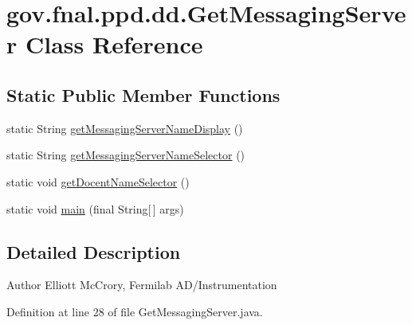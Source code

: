 \hypertarget{classgov_1_1fnal_1_1ppd_1_1dd_1_1GetMessagingServer}{\section{gov.\-fnal.\-ppd.\-dd.\-Get\-Messaging\-Server Class Reference}
\label{classgov_1_1fnal_1_1ppd_1_1dd_1_1GetMessagingServer}
}
\subsection*{Static Public Member Functions}
\begin{DoxyCompactItemize}
\item 
static String \hyperlink{classgov_1_1fnal_1_1ppd_1_1dd_1_1GetMessagingServer_a3b0e216307cae3742f3ff70aaf9ef8dc}{get\-Messaging\-Server\-Name\-Display} ()
\item 
static String \hyperlink{classgov_1_1fnal_1_1ppd_1_1dd_1_1GetMessagingServer_a61de9f8eb9c7e50565eb7d3d4f000cbb}{get\-Messaging\-Server\-Name\-Selector} ()
\item 
static void \hyperlink{classgov_1_1fnal_1_1ppd_1_1dd_1_1GetMessagingServer_afc14215a5c0b6624787c91e4d9501118}{get\-Docent\-Name\-Selector} ()
\item 
static void \hyperlink{classgov_1_1fnal_1_1ppd_1_1dd_1_1GetMessagingServer_a06768dfe96070006b7b3907a52def51e}{main} (final String\mbox{[}$\,$\mbox{]} args)
\end{DoxyCompactItemize}


\subsection{Detailed Description}
\begin{DoxyAuthor}{Author}
Elliott Mc\-Crory, Fermilab A\-D/\-Instrumentation 
\end{DoxyAuthor}


Definition at line 28 of file Get\-Messaging\-Server.\-java.




